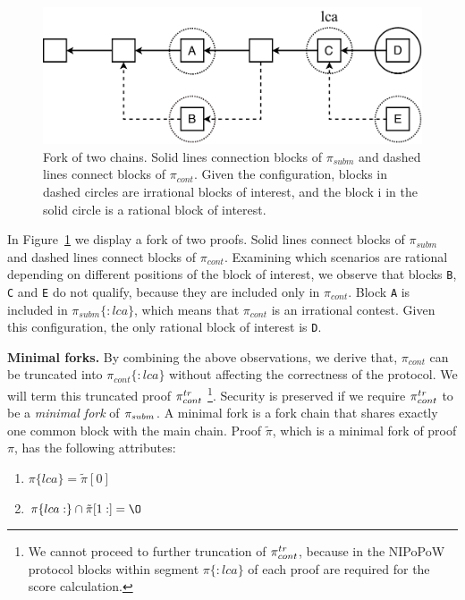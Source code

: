 \begin{figure}[h]
    \begin{center}
        \includegraphics[width=1\columnwidth]{figures/boi-position.pdf}
    \end{center}
    \caption{Fork of two chains. Solid lines connection blocks of $\pi_{subm}$
    and dashed lines connect blocks of $\pi_{cont}$. Given the configuration,
    blocks in dashed circles are irrational blocks of interest, and the block i
    in the solid circle is a rational block of interest.}
    \label{fig:boi-position}
\end{figure}

In Figure~\ref{fig:boi-position} we display a fork of two proofs. Solid lines
connect blocks of $\pi_{subm}$ and dashed lines connect blocks of $\pi_{cont}$.
Examining which scenarios are rational depending on different positions of the
block of interest, we observe that blocks \texttt{B}, \texttt{C} and \texttt{E}
do not qualify, because they are included only in $\pi_{cont}$. Block
\texttt{A} is included in $\pi_{subm}\{:lca\}$, which means that $\pi_{cont}$
is an irrational contest. Given this configuration, the only rational block of
interest is \texttt{D}.

\noindent \textbf{Minimal forks.} By combining the above observations, we
derive that, $\pi_{cont}$ can be truncated into $\pi_{cont}\{:lca\}$ without
affecting the correctness of the protocol. We will term this truncated proof
$\pi_{cont}^{tr}$ \footnote{We cannot proceed to further truncation of $\pi_{cont}^{tr}$, because
    in the NIPoPoW protocol blocks within segment $\pi\{:lca\}$ of each proof
are required for the score calculation.}. Security is preserved if we require
$\pi_{cont}^{tr}$ to be a \emph{minimal fork} of $\pi_{subm}$. A minimal fork is a fork chain
that shares exactly one common block with the main chain. Proof $\tilde\pi$,
which is a minimal fork of proof $\pi$, has the following attributes:

\begin{enumerate}
\item $\pi\{lca\} = \tilde\pi[0]$
\item $\pi\{lca:\} \cap \tilde\pi[1:] = \O$
\end{enumerate}

